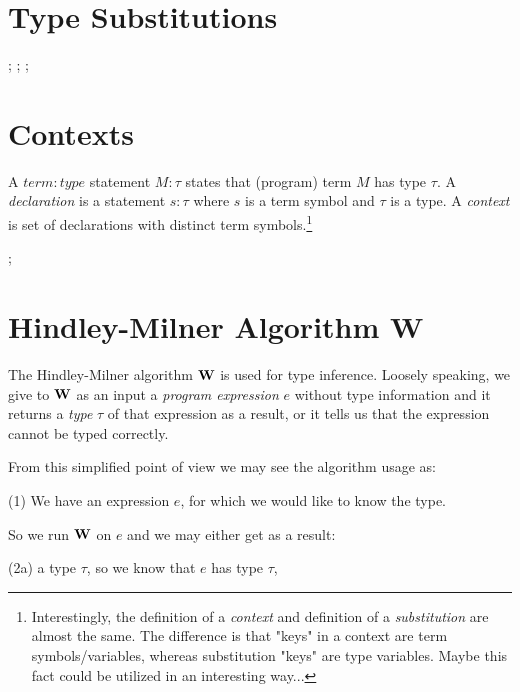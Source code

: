 \documentclass[a4paper,oneside]{memoir}
\begin{document}
\section{Type Substitutions}

 ;  ;  ; 



\section{Contexts}

\begin{definition}
A $\mathit{term:type}$ statement $\mathit{M}:\mathit{\tau}$ states that (program) term $M$ has type $\tau$.   
A \textit{declaration} is a statement $s : \tau$ where $s$ is a term symbol and $\tau$ is a type.
A \textit{context} is set of declarations with distinct term symbols.\footnote{Interestingly, the definition of a \textit{context} and definition of a \textit{substitution} are almost the same. The difference is that "keys" in a context are term symbols/variables, whereas substitution "keys" are type variables. Maybe this fact could be utilized in an interesting way...}
\end{definition}



 ; 



\section{Hindley-Milner Algorithm W}

The Hindley-Milner algorithm $\operatorname{\textbf{W}}$ is used for type inference.
Loosely speaking, we give to $\operatorname{\textbf{W}}$ as an input 
a \textit{program expression} $e$ without type information 
and it returns a \textit{type} $\tau$ of that expression as a result, 
or it tells us that the expression cannot be typed correctly.

From this simplified point of view we may see the algorithm usage as:

(1) We have an expression $e$, for which we would like to know the type. 

So we run $\operatorname{\textbf{W}}$ on $e$ and we may either get as a result:

(2a) a type $\tau$, so we know that $e$ has type $\tau$,
\end{document}
